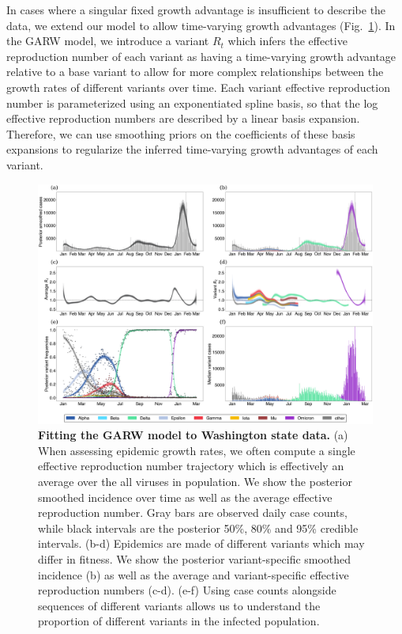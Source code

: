 In cases where a singular fixed growth advantage is insufficient to describe the data, we extend our model to allow time-varying growth advantages (Fig.~\ref{fig:GARW_rt_Washington}).
In the GARW model, we introduce a variant $R_{t}$ which infers the effective reproduction number of each variant as having a time-varying growth advantage relative to a base variant to allow for more complex relationships between the growth rates of different variants over time.
Each variant effective reproduction number is parameterized using an exponentiated spline basis, so that the log effective reproduction numbers are described by a linear basis expansion.
Therefore, we can use smoothing priors on the coefficients of these basis expansions to regularize the inferred time-varying growth advantages of each variant.

\begin{figure}[h!]
  \centering
  \includegraphics[width=\linewidth]{figs/GARW_rt_Washington.png}
  \caption{\textbf{Fitting the GARW model to Washington state data.}
    (a) When assessing epidemic growth rates, we often compute a single effective reproduction number trajectory which is effectively an average over the all viruses in population. We show the posterior smoothed incidence over time as well as the average effective reproduction number.
    Gray bars are observed daily case counts, while black intervals are the posterior 50\%, 80\% and 95\% credible intervals.
    (b-d) Epidemics are made of different variants which may differ in fitness.
    We show the posterior variant-specific smoothed incidence (b) as well as the average and variant-specific effective reproduction numbers (c-d).
    (e-f) Using case counts alongside sequences of different variants allows us to understand the proportion of different variants in the infected population.
    }
  \label{fig:GARW_rt_Washington}
\end{figure}

